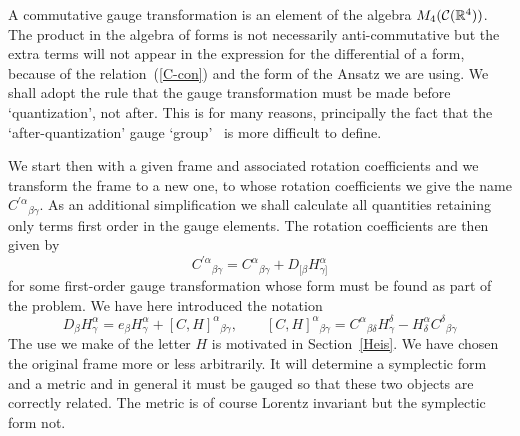 \documentclass[12pt,a4paper]{article}
\def\b#1{{\mathbb #1}}
\def\c#1{{\cal #1}}
\begin{document}
A commutative gauge transformation is an element of the algebra
$M_4(\c{C}(\b{R}^4))$.  The product in the algebra of forms is not
necessarily anti-commutative but the extra terms will not appear in
the expression for the differential of a form, because of the
relation~(\ref{C-con}) and the form of the Ansatz we are using. We
shall adopt the rule that the gauge transformation must be made before
`quantization', not after. This is for many reasons, principally the
fact that the `after-quantization' gauge
`group'~\cite{JurMolSchSchWes01} is more difficult to define.

We start then with a given frame and associated rotation coefficients
and we transform the frame to a new one, to whose rotation
coefficients we give the name $C^{\prime\alpha}{}_{\beta\gamma}$.  As an
additional simplification we shall calculate all quantities retaining
only terms first order in the gauge elements.  The rotation
coefficients are then given by
$$
C^{\prime\alpha}{}_{\beta\gamma} = C^\alpha{}_{\beta\gamma} + 
D_{[\beta} H^\alpha_{\gamma]}
$$
for some first-order gauge transformation whose form must be found
as part of the problem. We have here introduced the notation
$$
D_{\beta} H^\alpha_{\gamma} =
e_{\beta} H^\alpha_{\gamma} + [C,H]^\alpha{}_{\beta\gamma}, \qquad
[C,H]^\alpha{}_{\beta\gamma} = 
C^\alpha{}_{\beta\delta} H^\delta_{\gamma} -
H^\alpha_{\delta} C^\delta{}_{\beta\gamma} 
$$
The use we make of the letter $H$ is motivated in
Section~\ref{Heis}. We have chosen the original frame more or less
arbitrarily. It will determine a symplectic form and a metric and in
general it must be gauged so that these two objects are correctly
related. The metric is of course Lorentz invariant but the symplectic
form not.
\end{document}
